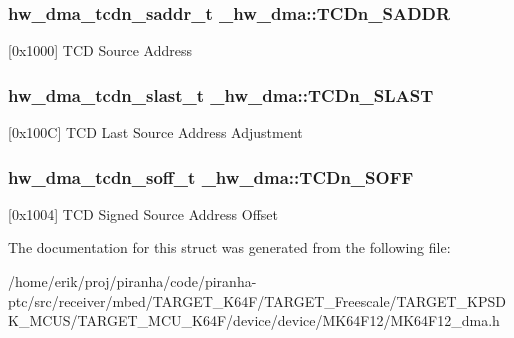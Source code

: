 \subsubsection[{\texorpdfstring{T\+C\+Dn\+\_\+\+S\+A\+D\+DR}{TCDn_SADDR}}]{ {\bf hw\+\_\+dma\+\_\+tcdn\+\_\+saddr\+\_\+t} \+\_\+hw\+\_\+dma\+::\+T\+C\+Dn\+\_\+\+S\+A\+D\+DR}\hypertarget{struct__hw__dma_a7e495c07dfc1c753f70291bcde93da4f}{}\label{struct__hw__dma_a7e495c07dfc1c753f70291bcde93da4f}
\mbox{[}0x1000\mbox{]} T\+CD Source Address 
\subsubsection[{\texorpdfstring{T\+C\+Dn\+\_\+\+S\+L\+A\+ST}{TCDn_SLAST}}]{ {\bf hw\+\_\+dma\+\_\+tcdn\+\_\+slast\+\_\+t} \+\_\+hw\+\_\+dma\+::\+T\+C\+Dn\+\_\+\+S\+L\+A\+ST}\hypertarget{struct__hw__dma_a834468626bf806efc9412ee87d0d06f3}{}\label{struct__hw__dma_a834468626bf806efc9412ee87d0d06f3}
\mbox{[}0x100C\mbox{]} T\+CD Last Source Address Adjustment 
\subsubsection[{\texorpdfstring{T\+C\+Dn\+\_\+\+S\+O\+FF}{TCDn_SOFF}}]{ {\bf hw\+\_\+dma\+\_\+tcdn\+\_\+soff\+\_\+t} \+\_\+hw\+\_\+dma\+::\+T\+C\+Dn\+\_\+\+S\+O\+FF}\hypertarget{struct__hw__dma_a097e88c2b7ed349373ed027398d5ad33}{}\label{struct__hw__dma_a097e88c2b7ed349373ed027398d5ad33}
\mbox{[}0x1004\mbox{]} T\+CD Signed Source Address Offset 

The documentation for this struct was generated from the following file\+:\begin{DoxyCompactItemize}
\item 
/home/erik/proj/piranha/code/piranha-\/ptc/src/receiver/mbed/\+T\+A\+R\+G\+E\+T\+\_\+\+K64\+F/\+T\+A\+R\+G\+E\+T\+\_\+\+Freescale/\+T\+A\+R\+G\+E\+T\+\_\+\+K\+P\+S\+D\+K\+\_\+\+M\+C\+U\+S/\+T\+A\+R\+G\+E\+T\+\_\+\+M\+C\+U\+\_\+\+K64\+F/device/device/\+M\+K64\+F12/M\+K64\+F12\+\_\+dma.\+h\end{DoxyCompactItemize}
